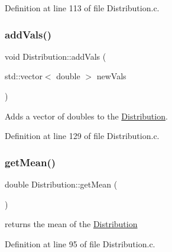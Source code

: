 Definition at line 113 of file Distribution.\+c.

\mbox{\label{class_world_architect_1_1_distribution_a42bcb9543c69fb3b07f84038a9344dae}} 
\subsubsection{\texorpdfstring{addVals()}{addVals()}}
{\footnotesize\ttfamily void Distribution\+::add\+Vals (\begin{DoxyParamCaption}\item[{std\+::vector$<$ double $>$}]{new\+Vals }\end{DoxyParamCaption})}



Adds a vector of doubles to the \mbox{\hyperlink{class_world_architect_1_1_distribution}{Distribution}}. 



Definition at line 129 of file Distribution.\+c.

\mbox{\label{class_world_architect_1_1_distribution_ab73d4ad1b0fb08c1fc9fe4c4973ff853}} 
\subsubsection{\texorpdfstring{getMean()}{getMean()}}
{\footnotesize\ttfamily double Distribution\+::get\+Mean (\begin{DoxyParamCaption}{ }\end{DoxyParamCaption})}



returns the mean of the \mbox{\hyperlink{class_world_architect_1_1_distribution}{Distribution}} 



Definition at line 95 of file Distribution.\+c.

\mbox{\label{class_world_architect_1_1_distribution_a2a692fa51284c64fd37476e7d6b1376e}} 
